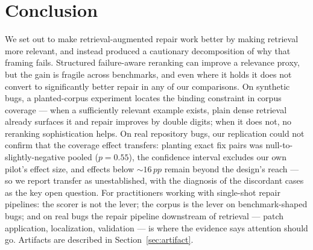 \documentclass[10pt,conference]{IEEEtran}
\newcommand{\pp}{\,pp}
\begin{document}
\section{Conclusion}
\label{sec:conclusion}

We set out to make retrieval-augmented repair work better by making
retrieval more relevant, and instead produced a cautionary decomposition of
why that framing fails. Structured failure-aware reranking can improve a
relevance proxy, but the gain is fragile across benchmarks, and even where
it holds it does not convert to significantly better repair in any of our
comparisons. On synthetic bugs, a planted-corpus experiment locates the
binding constraint in corpus coverage --- when a sufficiently relevant
example exists, plain dense retrieval already surfaces it and repair
improves by double digits; when it does not, no reranking sophistication
helps. On real repository bugs, our replication could not confirm that the
coverage effect transfers: planting exact fix pairs was
null-to-slightly-negative pooled ($p{=}0.55$), the confidence interval
excludes our own pilot's effect size, and effects below ${\sim}16\pp$
remain beyond the design's reach --- so we report transfer as
unestablished, with the diagnosis of the discordant cases as the key open
question. For practitioners working with single-shot repair pipelines: the
scorer is not the lever; the corpus is the lever on benchmark-shaped bugs;
and on real bugs the repair pipeline downstream of retrieval --- patch
application, localization, validation --- is where the evidence says
attention should go. Artifacts are described in Section~\ref{sec:artifact}.



\end{document}
